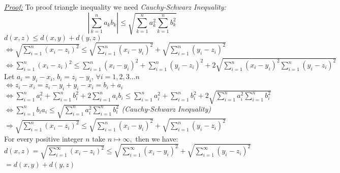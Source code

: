 \documentclass[12pt]{article}
\begin{document}
\begin{center} 
\end{center}
\textit{\underline{\color{red}Proof:}}
To proof triangle inequality we need \textit{\color{blue}Cauchy-Schwarz	Inequality:}\\
{$$\left |\sum_{k=1}^{n}a_k b_k \right |\leq \sqrt{\sum_{k=1}^{n}a_k^2 \sum_{k=1}^{n}b_k^2}$$}
$d(x,z)\leq d(x,y)+d(y,z)$\\
$\Leftrightarrow \sqrt{\sum_{i=1}^{n}(x_i-z_i)^2}\leq \sqrt{\sum_{i=1}^{n}(x_i-y_i)^2}+\sqrt{\sum_{i=1}^{n}(y_i-z_i)^2}$\\
$\Leftrightarrow \sum_{i=1}^{n}(x_i-z_i)^2\leq \sum_{i=1}^{n}(x_i-y_i)^2+\sum_{i=1}^{n}(y_i-z_i)^2+2\sqrt{\sum_{i=1}^{n}(x_i-y_i)^2\sum_{i=1}^{n}(y_i-z_i)^2}$\\
Let $a_i=y_i-x_i$,  $b_i=z_i-y_i$, $\forall i=1,2,3...n$\\
$\Leftrightarrow z_i-x_i=z_i-y_i+y_i-x_i=b_i+a_i$\\
$\Leftrightarrow \sum_{i=1}^{n}a_i^2+ \sum_{i=1}^{n}b_i^2+2\sum_{i=1}^{n}a_i b_i\leq \sum_{i=1}^{n}a_i^2+\sum_{i=1}^{n}b_i^2+2\sqrt{\sum_{i=1}^{n}a_i^2\sum_{i=1}^{n} b_i^2}$
$\Leftrightarrow \sum_{i=1}^{n}b_i a_i\leq \sqrt{\sum_{i=1}^{n}a_i^2\sum_{i=1}^{n} b_i^2}$ \textit{\color{blue}(Cauchy-Schwarz Inequality)}\\
$\Rightarrow\sqrt{\sum_{i=1}^{n}(x_i-z_i)^2}\leq \sqrt{\sum_{i=1}^{n}(x_i-y_i)^2}+\sqrt{\sum_{i=1}^{n}(y_i-z_i)^2}$\\
For every positive integer $n$ take $n\mapsto\infty,$ then we have:\\
$d(x,z)=\sqrt{\sum_{i=1}^{\infty}(x_i-z_i)^2}\leq
\sqrt{\sum_{i=1}^{\infty}(x_i-y_i)^2}+\sqrt{\sum_{i=1}^{\infty}(y_i-z_i)^2}$\\
$=d(x,y)+d(y,z)$\
\newpage
\end{document}

